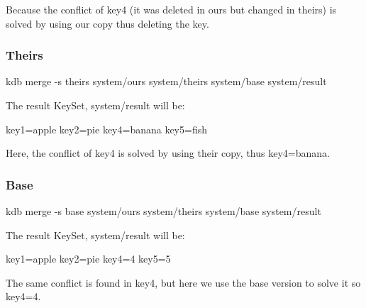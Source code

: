 Because the conflict of key4 (it was deleted in ours but changed in theirs) is solved by using our copy thus deleting the key.

\subsubsection*{Theirs}

\begin{DoxyVerb}    kdb merge -s theirs system/ours system/theirs system/base system/result
\end{DoxyVerb}


The result Key\+Set, system/result will be\+: \begin{DoxyVerb}    key1=apple
    key2=pie
    key4=banana
    key5=fish
\end{DoxyVerb}


Here, the conflict of key4 is solved by using their copy, thus key4=banana.

\subsubsection*{Base}

\begin{DoxyVerb}    kdb merge -s base system/ours system/theirs system/base system/result
\end{DoxyVerb}


The result Key\+Set, system/result will be\+: \begin{DoxyVerb}    key1=apple
    key2=pie
    key4=4
    key5=5
\end{DoxyVerb}


The same conflict is found in key4, but here we use the base version to solve it so key4=4. 